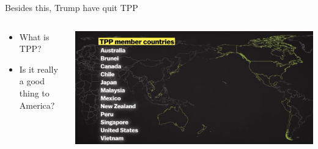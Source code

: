 \documentclass[10pt,hyperref={CJKbookmarks=true},xcolor=dvipsnames,aspectratio=169]{beamer}
\begin{document}
\begin{frame}{Besides this, Trump have quit TPP}


\begin{columns}[onlytextwidth]
\begin{column}{0.4\textwidth}
\begin{itemize}
\item What is TPP?
\item Is it really a good thing to America?
\end{itemize}

\end{column}
\begin{column}{0.6\textwidth}
\includegraphics[width=\columnwidth]{fig//trump4}
\end{column}
\end{columns}

\end{frame}
\end{document}
